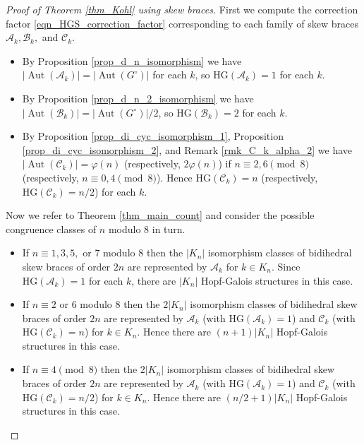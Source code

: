 \documentclass[reqno]{amsart}
\theoremstyle{definition}
\DeclareMathOperator{\Aut}{\mbox{Aut}}
\begin{document}
\begin{proof}[Proof of Theorem \ref{thm_Kohl} using skew braces]
First we compute the correction factor \eqref{eqn_HGS_correction_factor} corresponding to each family of skew braces $ \mathscr{A}_{k}, \mathscr{B}_{k}, $ and $ \mathscr{C}_{k} $. 
\begin{itemize}
\item By Proposition \ref{prop_d_n_isomorphism} we have $ | \Aut(\mathscr{A}_{k}) | = | \Aut(G^{\circ}) | $ for each $ k $, so $ \mathrm{HG}(\mathscr{A}_{k})=1 $ for each $ k $. 
\item By Proposition \ref{prop_d_n_2_isomorphism} we have $ | \Aut(\mathscr{B}_{k}) | = | \Aut(G^{\circ}) | / 2 $, so $ \mathrm{HG}(\mathscr{B}_{k})= 2 $ for each $ k $. 
\item By Proposition \ref{prop_di_cyc_isomorphism_1}, Proposition \ref{prop_di_cyc_isomorphism_2}, and Remark \ref{rmk_C_k_alpha_2} we have $ | \Aut(\mathscr{C}_{k}) | = \varphi(n) $ (respectively, $ 2\varphi(n) $) if $ n \equiv 2,6 \pmod{8} $ (respectively, $ n \equiv 0,4 \pmod{8} $).  Hence $ \mathrm{HG}(\mathscr{C}_{k})= n $ (respectively, $ \mathrm{HG}(\mathscr{C}_{k})= n/2 $) for each $ k $. 
\end{itemize}

Now we refer to Theorem \ref{thm_main_count} and consider the possible congruence classes of $ n $ modulo $ 8 $ in turn.

\begin{itemize}
\item If $ n \equiv 1,3,5, $ or $ 7 $ modulo $ 8 $ then the $ |K_{n}| $ isomorphism classes of bidihedral skew braces of order $ 2n $ are represented by $ \mathscr{A}_{k} $ for $ k \in K_{n} $. Since $ \mathrm{HG}(\mathscr{A}_{k})=1 $ for each $ k $, there are $ |K_{n}| $ Hopf-Galois structures in this case. 

\item If $ n \equiv 2 $ or $ 6 $ modulo $ 8 $ then the $ 2|K_{n}| $ isomorphism classes of bidihedral skew braces of order $ 2n $ are represented by $ \mathscr{A}_{k} $ (with $ \mathrm{HG}(\mathscr{A}_{k})=1$) and $ \mathscr{C}_{k} $  (with $ \mathrm{HG}(\mathscr{C}_{k})=n $) for $ k \in K_{n} $. Hence there are $ (n+1)|K_{n}| $ Hopf-Galois structures in this case. 

\item If $ n \equiv 4 \pmod{8} $ then the $ 2|K_{n}| $ isomorphism classes of bidihedral skew braces of order $ 2n $ are represented by $ \mathscr{A}_{k} $ (with $ \mathrm{HG}(\mathscr{A}_{k})=1$) and $ \mathscr{C}_{k} $ (with $ \mathrm{HG}(\mathscr{C}_{k})= n/2 $) for $ k \in K_{n} $. Hence there are $ (n/2+1)|K_{n}| $ Hopf-Galois structures in this case. 


\end{itemize}
\end{proof}
\end{document}
